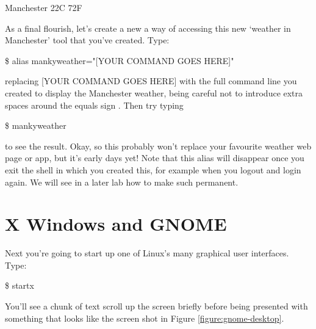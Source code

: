 \begin{ttoutenv}
   [33]Manchester 22\textdegree{}C 72\textdegree{}F
\end{ttoutenv}

As a final flourish, let's create a new a way of accessing this new `weather in Manchester' tool that you've created. Type:

\begin{ttoutenv}
\$ alias mankyweather="[YOUR COMMAND GOES HERE]"
\end{ttoutenv}

replacing [YOUR COMMAND GOES HERE] with the full command line you created to display the Manchester weather, being careful not to introduce extra spaces around the equals sign \ttout{=}. Then try typing

\begin{ttoutenv}
\$ mankyweather
\end{ttoutenv}


to see the result. Okay, so this probably won't replace your favourite weather web page or app, but it's early days yet!
Note that this alias will disappear once you exit the shell in which you created this, for example when you logout and login again. We will see in a later lab how to make such  permanent.


\section{X Windows and GNOME}

Next you're going to start up one of Linux's many graphical user interfaces. Type:

\begin{ttoutenv}
\$ startx
\end{ttoutenv}


You'll see a chunk of text scroll up the screen briefly before being presented with something that looks like the screen shot in Figure \ref{figure:gnome-desktop}.

